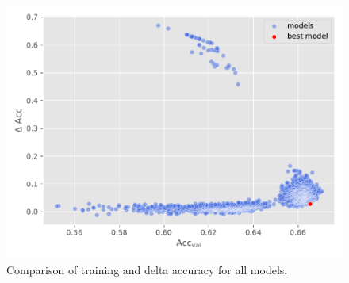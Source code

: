 \documentclass[
  12pt,
  bibliography=totoc,     %
  captions=tableheading,  %
  titlepage=firstiscover, %
]{scrartcl}
\begin{document}
\begin{figure}[H]
  \centering
  \includegraphics[scale=0.56]{figures/NN/HPO_scatter.pdf}
  \caption{Comparison of training and delta accuracy for all models.}
  \label{fig:HPO_scatter}
\end{figure}
\end{document}
